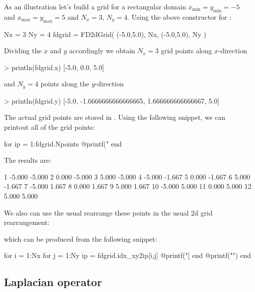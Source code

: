 As an illustration let's build a grid for a rectangular domain
$x_\mathrm{min} = y_{\mathrm{min}}=-5$ and $x_\mathrm{max} = y_{\mathrm{max}}=5$
and $N_{x}=3$, $N_{y}=4$.
Using the above constructor for :
\begin{juliacode}
Nx = 3
Ny = 4
fdgrid = FD2dGrid( (-5.0,5.0), Nx, (-5.0,5.0), Ny )
\end{juliacode}
%
Dividing the $x$ and $y$ accordingly we obtain $N_{x}=3$
grid points along $x$-direction
%
\begin{textcode}
> println(fdgrid.x)
[-5.0, 0.0, 5.0]
\end{textcode}
%
and $N_{y}=4$ points along the $y$-direction
\begin{textcode}
> println(fdgrid.y)
[-5.0, -1.6666666666666665, 1.666666666666667, 5.0]
\end{textcode}
%
The actual grid points are stored in . Using the
following snippet, we can printout all of the grid points:
%
\begin{juliacode}
for ip = 1:fdgrid.Npoints
    @printf("%
end
\end{juliacode}
%
The results are:
%
\begin{textcode}
  1   -5.000   -5.000
  2    0.000   -5.000
  3    5.000   -5.000
  4   -5.000   -1.667
  5    0.000   -1.667
  6    5.000   -1.667
  7   -5.000    1.667
  8    0.000    1.667
  9    5.000    1.667
 10   -5.000    5.000
 11    0.000    5.000
 12    5.000    5.000
\end{textcode}
%
We also can use the usual rearrange these points in the usual 2d grid rearrangement:
%
\begin{textcode}
[  -5.000,  -5.000] [  -5.000,  -1.667] [  -5.000,   1.667] [  -5.000,   5.000] 
[   0.000,  -5.000] [   0.000,  -1.667] [   0.000,   1.667] [   0.000,   5.000] 
[   5.000,  -5.000] [   5.000,  -1.667] [   5.000,   1.667] [   5.000,   5.000]
\end{textcode}
%
which can be produced from the following snippet:
%
\begin{juliacode}
for i = 1:Nx
    for j = 1:Ny
        ip = fdgrid.idx_xy2ip[i,j]
        @printf("[%
    end
    @printf("\n")
end
\end{juliacode}



\subsection{Laplacian operator}

